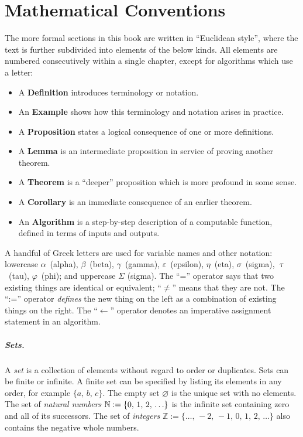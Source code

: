 \documentclass[../generics]{subfiles}
\begin{document}
\chapter{Mathematical Conventions}\label{math summary}

The more formal sections in this book are written in ``Euclidean style'', where the text is further subdivided into elements of the below kinds. All elements are numbered consecutively within a single chapter, except for algorithms which use a letter:
\begin{itemize}
\item A \textbf{Definition} introduces terminology or notation.
\item An \textbf{Example} shows how this terminology and notation arises in practice.
\item A \textbf{Proposition} states a logical consequence of one or more definitions.
\item A \textbf{Lemma} is an  intermediate proposition in service of proving another theorem.
\item A \textbf{Theorem} is a ``deeper'' proposition which is more profound in some sense.
\item A \textbf{Corollary} is an immediate consequence of an earlier theorem.
\item An \textbf{Algorithm} is a step-by-step description of a computable function, defined in terms of inputs and outputs.
\end{itemize}

A handful of Greek letters are used for variable names and other notation: lowercase $\alpha$~(alpha), $\beta$~(beta), $\gamma$~(gamma), $\varepsilon$~(epsilon), $\eta$~(eta), $\sigma$~(sigma), $\uptau$~(tau), $\varphi$~(phi); and uppercase $\Sigma$ (sigma). The ``='' operator says that two existing things are identical or equivalent; ``$\neq$'' means that they are not. The ``:='' operator \emph{defines} the new thing on the left as a combination of existing things on the right. The ``$\leftarrow$'' operator denotes an imperative assignment statement in an algorithm.

\paragraph{Sets.}
A \emph{set} is a collection of elements without regard to order or duplicates. Sets can be finite or infinite. A finite set can be specified by listing its elements in any order, for example $\{a,\,b,\,c\}$. The empty set \index{$\varnothing$}$\varnothing$ is the unique set with no elements. The set of \emph{natural numbers} \index{$\NN$}$\mathbb{N}:=\{0,\,1,\,2,\,\ldots\}$ is the infinite set containing zero and all of its successors. The set of \emph{integers} $\mathbb{Z}:=\{\ldots,\,-2,\,-1,\,0,\,1,\,2,\,\ldots\}$ also contains the negative whole numbers.
\end{document}
